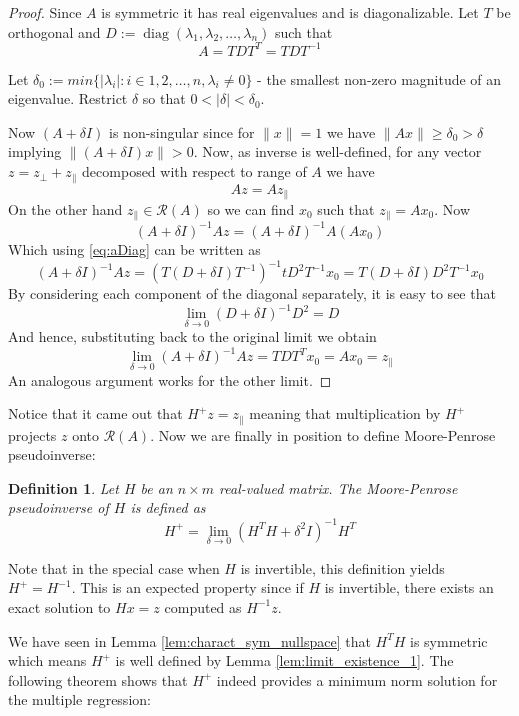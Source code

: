 \documentclass[a4paper]{article}
\theoremstyle{break}
\newtheorem{definition}{Definition}[section]
\newcommand{\Ra}{\mathcal{R}}
\DeclareMathOperator{\diag}{diag}
\newcommand{\pll}{\parallel}
\begin{document}
\begin{proof}
    Since $A$ is symmetric it has real eigenvalues and is diagonalizable.
    Let $T$ be orthogonal and $D := \diag (\lambda_1, \lambda_2, \ldots, \lambda_n)$ such that
    \begin{equation}
    \label{eq:aDiag}
        A = T D T^T = T D T^{-1}
    \end{equation}
    
    Let $ \delta_0 := min\{ | \lambda_i | : i \in {1, 2, \ldots, n}, \lambda_i \neq 0 \}$ - the smallest non-zero magnitude of an eigenvalue.
    Restrict $ \delta$ so that $ 0 <  | \delta | < \delta_0$.
    
    Now $(A + \delta I)$ is non-singular since for $ \| x \| = 1$ we have $ \| A x \| \geq \delta_0 > \delta$
    implying $ \| (A + \delta I) x \| > 0 $.
    Now, as inverse is well-defined, for any vector $z = z_\perp + z_\pll$ decomposed with respect to range of $A$ we have
    $$ A z = A z_\pll$$
    On the other hand $z_\pll \in \Ra(A)$ so we can find $x_0$ such that $ z_\pll = A x_0$. Now
    $$ (A + \delta I)^{-1} A z = (A + \delta I)^{-1} A (A x_0) $$
    Which using \eqref{eq:aDiag} can be written as
    $$ (A + \delta I)^{-1} A z =
    (T(D + \delta I) T^{-1})^{-1} t D^2 T^{-1} x_0 =
    T (D + \delta I) D^2 T^{-1} x_0
    $$
    By considering each component of the diagonal separately, it is easy to see that
    $$ \lim_{\delta \to 0} (D + \delta I)^{-1} D^2 = D $$
    And hence, substituting back to the original limit we obtain
    $$ \lim_{\delta \to 0} ( A + \delta I) ^{-1} A z = T D T^T x_0 = A x_0 = z_\pll $$
    An analogous argument works for the other limit.
\end{proof}

Notice that it came out that $ H^+ z = z_\pll$ meaning that multiplication by $H^+$ projects $z$ onto $\Ra(A)$. Now we are finally in position to define Moore-Penrose pseudoinverse:

\begin{definition}
    Let $H$ be an $ n \times m $ real-valued matrix.
    The Moore-Penrose pseudoinverse of $H$ is defined as
    $$ H^+ = \lim_{\delta \to 0} ( H^T H + \delta^2 I) ^{-1} H^T $$
\end{definition}

Note that in the special case when $H$ is invertible, this definition yields $H^+ = H^{-1}$. This is an expected property since if $H$ is invertible, there exists an exact solution to $ H x = z $ computed as $ H^{-1} z$.

We have seen in Lemma \ref{lem:charact_sym_nullspace} that $H^T H$ is symmetric which means $H^+$ is well defined by Lemma \ref{lem:limit_existence_1}. The following theorem shows that $ H^+$ indeed provides a minimum norm solution for the multiple regression:
\end{document}
